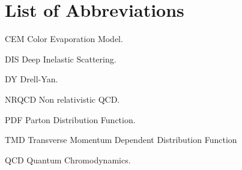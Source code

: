 \chapter{List of Abbreviations}

\begin{abbrevlist}
\item[CEM] Color Evaporation Model.
\item[DIS] Deep Inelastic Scattering.
\item[DY] Drell-Yan.
\item[NRQCD] Non relativistic QCD.
\item[PDF] Parton Distribution Function.
\item[TMD] Transverse Momentum Dependent Distribution Function 
\item[QCD] Quantum Chromodynamics.
\end{abbrevlist}

